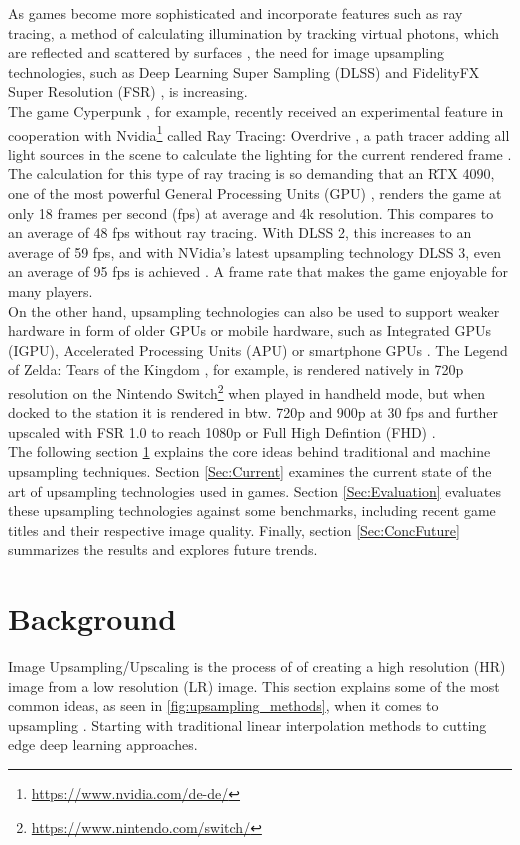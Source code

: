 \documentclass[letterpaper, 10 pt, conference]{ieeeconf}  %
\begin{document}
As games become more sophisticated and incorporate features such as ray tracing, a method of calculating illumination by tracking virtual photons, 
which are reflected and scattered by surfaces \cite{ray_tracing}, the need for image upsampling technologies, such as Deep Learning Super Sampling (DLSS) \cite{dlss} and FidelityFX Super Resolution (FSR) \cite{fsr}, 
is increasing. \\
The game Cyperpunk \cite{Cyperpunk}, for example, recently received an experimental feature in cooperation with Nvidia\footnote{\url{https://www.nvidia.com/de-de/}} 
called Ray Tracing: Overdrive \cite{ray_tracing_overdrive}, a path tracer adding all light sources in the scene to calculate the lighting for the current rendered frame \cite{Shirley2020RTW1}.
The calculation for this type of ray tracing is so demanding that an RTX 4090, 
one of the most powerful General Processing Units (GPU) \cite{4k_gpu_bench}, renders the game at only 18 frames per second (fps) at average and 4k resolution. 
This compares to an average of 48 fps without ray tracing. With DLSS 2, this increases to an average of 59 fps, and with NVidia's latest upsampling technology DLSS 3, even an average of 95 fps is achieved \cite{digital_foundry_ray}. 
A frame rate that makes the game enjoyable for many players. \\
On the other hand, upsampling technologies can also be used to support weaker hardware in form of older GPUs or mobile hardware, such as Integrated GPUs (IGPU), Accelerated Processing Units (APU) or smartphone GPUs \cite{dong2022rendersr}.
The Legend of Zelda: Tears of the Kingdom \cite{ZeldaTotK}, for example, is rendered natively in 720p resolution on the Nintendo Switch\footnote{\url{https://www.nintendo.com/switch/}} when played in handheld mode, 
but when docked to the station it is rendered in btw. 720p and 900p at 30 fps and further upscaled with FSR 1.0 to reach 1080p or Full High Defintion (FHD) \cite{digital_foundry_zelda_fsr}. \\
The following section \ref{Sec:RelatedWork} explains the core ideas behind traditional and machine upsampling techniques.
Section \ref{Sec:Current} examines the current state of the art of upsampling technologies used in games.
Section \ref{Sec:Evaluation} evaluates these upsampling technologies against some benchmarks, including recent game titles and their respective image quality.
Finally, section \ref{Sec:ConcFuture} summarizes the results and explores future trends.

\section{Background}
\label{Sec:RelatedWork}
Image Upsampling/Upscaling is the process of of creating a high resolution (HR) image from a low resolution (LR) image.
This section explains some of the most common ideas, as seen in \ref{fig:upsampling_methods}, when it comes to upsampling \cite{wang2022interpolation}\cite{wang2020deep}.
Starting with traditional linear interpolation methods to cutting edge deep learning approaches. 
\end{document}
